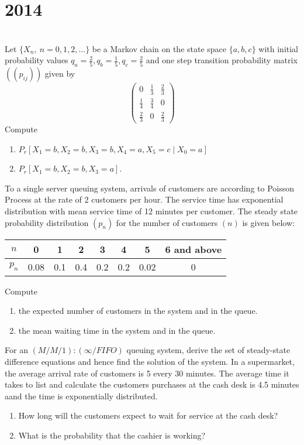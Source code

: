 \section*{2014}
\vspace{-.5cm}
\hrulefill \smallskip\\
 Let $ \{ X_n, \: n = 0,1,2, \ldots \}$ be a Markov chain on the state space $\{a , b , c\}$ with initial probability values $\displaystyle q_a = \frac{2}{5}, q_b = \frac{1}{5}, q_c = \frac{2}{5}$ and one step transition probability matrix $((p_{ij}))$ given by
\[ \left( \begin{array}{ccc}
    0 & \frac{1}{3} & \frac{2}{3}  \\
    \frac{1}{4} & \frac{3}{4} & 0 \\
    \frac{2}{3} & 0 & \frac{2}{3}
\end{array} \right) \]
Compute
\begin{enumerate}[itemsep = 0pt,label=(\roman*)]
    \item $P_r\left[X_1=b,X_2 =b,X_3 =b,X_4 =a,X_5 =c \middle|X_0 =a \right]$
    \item $P_r\left[X_1=b,X_2 =b,X_3 = a \right]$.
\end{enumerate}
 To a single server queuing system, arrivals of customers are according to Poisson Process at the rate of 2 customers per hour. The service time has exponential distribution with mean service time of 12 minutes per customer. The steady state probability distribution $(p_n)$ for the number of customers $(n)$ is given below:
\begin{center}
    \begin{tabular}{| c | *{6}{c|} c|}
    \hline
    $n$ & 0 & 1 & 2 & 3 & 4 & 5 & 6 and above \\ \hline
    $p_n$& 0.08 & 0.1 & 0.4 &0.2 & 0.2 & 0.02 & 0 \\ \hline
   \end{tabular}
\end{center}
Compute
\begin{enumerate}[ itemsep = -1ex,label=(\roman*)]
    \vspace{-1ex}
    \item the expected number of customers in the system and in the queue.
    \item the mean waiting time in the system and in the queue.
\end{enumerate}
 For an $(M/M/1):(\infty/FIFO)$ queuing system, derive the set of steady-state difference equations and hence find the solution of the system. In a supermarket, the average arrival rate of customers is 5 every 30 minutes. The average time it takes to list and calculate the customers purchases at the cash desk is 4.5 minutes aand the time is exponentially distributed.
\begin{enumerate}[itemsep = -1ex,label=(\roman*)]
    \vspace{-1ex}
    \item How long will the customers expect to wait for service at the cash desk?
    \item What is the probability that the cashier is working?
\end{enumerate}